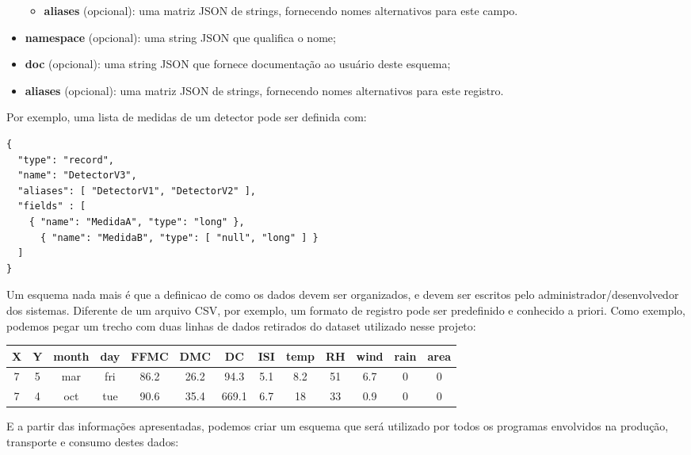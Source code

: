 \documentclass[12pt]{article}
\begin{document}
\begin{itemize}
\begin{itemize}
        \item \textbf{aliases} (opcional): uma matriz JSON de strings, fornecendo nomes alternativos para este campo.
    \end{itemize}
    
    \item \textbf{namespace} (opcional): uma string JSON que qualifica o nome;
    
    \item \textbf{doc} (opcional): uma string JSON que fornece documentação ao usuário deste esquema;
    
    \item \textbf{aliases} (opcional): uma matriz JSON de strings, fornecendo nomes alternativos para este registro.
\end{itemize}

Por exemplo, uma lista de medidas de um detector pode ser definida com:
\begin{lstlisting}
{ 
  "type": "record", 
  "name": "DetectorV3",
  "aliases": [ "DetectorV1", "DetectorV2" ],
  "fields" : [ 
    { "name": "MedidaA", "type": "long" },
      { "name": "MedidaB", "type": [ "null", "long" ] }
  ] 
}
\end{lstlisting}

Um esquema nada mais é que a definicao de como os dados devem ser organizados, e devem ser escritos pelo administrador/desenvolvedor dos sistemas. Diferente de um arquivo CSV, por exemplo, um formato de registro pode ser predefinido e conhecido a priori. Como exemplo, podemos pegar um trecho com duas linhas de dados retirados do dataset utilizado nesse projeto:

\begin{center}
    \begin{tabular}{ |c|c|c|c|c|c|c|c|c|c|c|c|c| }
        \hline
        X	& Y & month	& day	& FFMC	& DMC	& DC	& ISI	& temp	& RH	& wind	& rain	& area  \\
        \hline
        7	& 5	& mar	& fri	& 86.2	& 26.2	& 94.3	& 5.1	& 8.2	& 51	& 6.7	& 0	    & 0     \\
        7	& 4	& oct	& tue	& 90.6	& 35.4	& 669.1	& 6.7	& 18	& 33	& 0.9	& 0	    & 0     \\
        \hline
    \end{tabular}
\end{center}

E a partir das informações apresentadas, podemos criar um esquema que será utilizado por todos os programas envolvidos na produção, transporte e consumo destes dados:
\end{document}
